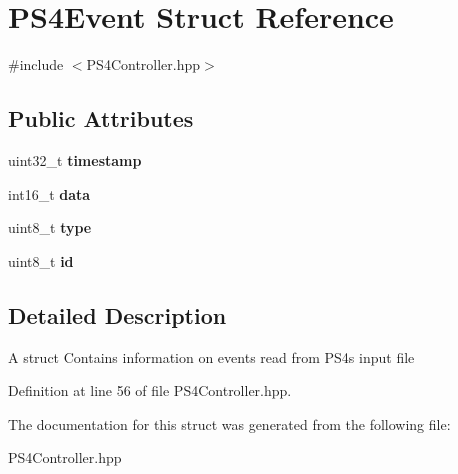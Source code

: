 \hypertarget{struct_p_s4_event}{}\section{P\+S4\+Event Struct Reference}
\label{struct_p_s4_event}


{\ttfamily \#include $<$P\+S4\+Controller.\+hpp$>$}

\subsection*{Public Attributes}
\begin{DoxyCompactItemize}
\item 
\mbox{\label{struct_p_s4_event_ac1a4943f272199fc8fb2b39b8870ad27}} 
uint32\+\_\+t {\bfseries timestamp}
\item 
\mbox{\label{struct_p_s4_event_a45d7af83b97c1b3562de34e412769b82}} 
int16\+\_\+t {\bfseries data}
\item 
\mbox{\label{struct_p_s4_event_a9b861b1575bdfc248c881a795e4af81a}} 
uint8\+\_\+t {\bfseries type}
\item 
\mbox{\label{struct_p_s4_event_af2c0d06bcc928d9449a80c42ef502c08}} 
uint8\+\_\+t {\bfseries id}
\end{DoxyCompactItemize}


\subsection{Detailed Description}
A struct Contains information on events read from P\+S4\textquotesingle{}s input file 

Definition at line 56 of file P\+S4\+Controller.\+hpp.



The documentation for this struct was generated from the following file\+:\begin{DoxyCompactItemize}
\item 
P\+S4\+Controller.\+hpp\end{DoxyCompactItemize}
